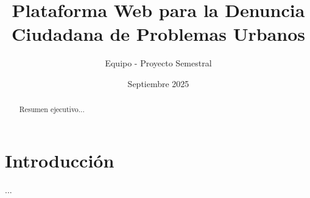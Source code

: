 \documentclass{article}
\title{Plataforma Web para la Denuncia Ciudadana de Problemas Urbanos}
\author{Equipo - Proyecto Semestral}
\date{Septiembre 2025}
\begin{document}
\maketitle
\begin{abstract}
Resumen ejecutivo...
\end{abstract}
\section{Introducción}
...
\end{document}
